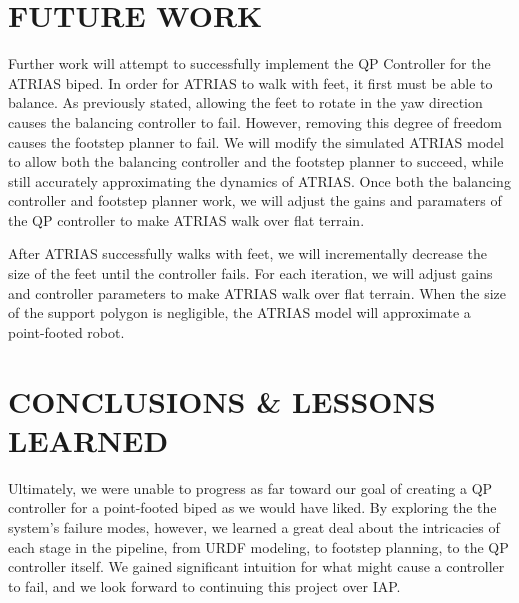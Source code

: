 \documentclass[letterpaper, 10 pt, conference]{ieeeconf}  %
\begin{document}
\section{FUTURE WORK}
Further work will attempt to successfully implement the QP Controller for the ATRIAS biped. In order for ATRIAS to walk with feet, it first must be able to balance. As previously stated, allowing the feet to rotate in the yaw direction causes the balancing controller to fail. However, removing this degree of freedom causes the footstep planner to fail. We will modify the simulated ATRIAS model to allow both the balancing controller and the footstep planner to succeed, while still accurately approximating the dynamics of ATRIAS. Once both the balancing controller and footstep planner work, we will adjust the gains and paramaters of the QP controller to make ATRIAS walk over flat terrain. 

After ATRIAS successfully walks with feet, we will incrementally decrease the size of the feet until the controller fails. For each iteration, we will adjust gains and controller parameters to make ATRIAS walk over flat terrain. When the size of the support polygon is negligible, the ATRIAS model will approximate a point-footed robot.

\section{CONCLUSIONS \& LESSONS LEARNED}

Ultimately, we were unable to progress as far toward our goal of creating a QP controller for a point-footed biped as we would have liked. By exploring the the system's failure modes, however, we learned a great deal about the intricacies of each stage in the pipeline, from URDF modeling, to footstep planning, to the QP controller itself. We gained significant intuition for what might cause a controller to fail, and we look forward to continuing this project over IAP.

\addtolength{\textheight}{-12cm}   %
\end{document}
